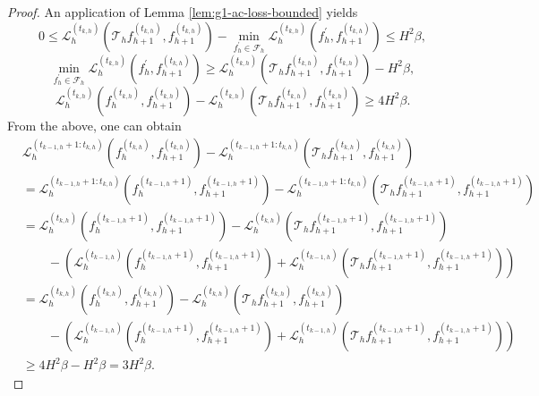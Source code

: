 \begin{proof}
    An application of Lemma \ref{lem:g1-ac-loss-bounded} yields 
    $$0 \leq \mathcal{L}_h^{\left(t_{k,h}\right)}\left(\mathcal{T}_h f_{h+1}^{(t_{k,h})}, f_{h+1}^{(t_{k,h})}\right)-\min _{f_h^{\prime} \in \mathcal{F}_h} \mathcal{L}_h^{\left(t_{k,h}\right)}\left(f_h^{\prime}, f_{h+1}^{(t_{k,h})}\right) \leq H^2 \beta,$$
    $$\min _{f_h^{\prime} \in \mathcal{F}_h} \mathcal{L}_h^{\left(t_{k,h}\right)}\left(f_h^{\prime}, f_{h+1}^{(t_{k,h})}\right)  \geq \mathcal{L}_h^{\left(t_{k,h}\right)}\left(\mathcal{T}_h f_{h+1}^{(t_{k,h})}, f_{h+1}^{(t_{k,h})}\right)- H^2 \beta,$$
    $$\mathcal{L}_h^{(t_{k,h})}\left(f_h^{(t_{k,h})}, f_{h+1}^{(t_{k,h})}\right)-\mathcal{L}_h^{\left(t_{k,h}\right)}\left(\mathcal{T}_h f_{h+1}^{(t_{k,h})}, f_{h+1}^{(t_{k,h})}\right) \geq 4H^2\beta.
    $$
    From the above, one can obtain 
    \begin{align}
        &\mathcal{L}_h^{(t_{k-1,h}+1:t_{k,h})}\left(f_h^{(t_{k,h})}, f_{h+1}^{(t_{k,h})}\right)-\mathcal{L}_h^{\left(t_{k-1,h}+1:t_{k,h}\right)}\left(\mathcal{T}_h f_{h+1}^{(t_{k,h})}, f_{h+1}^{(t_{k,h})}\right) \nonumber\\
        &=\mathcal{L}_h^{(t_{k-1,h}+1:t_{k,h})}\left(f_h^{(t_{k-1,h}+1)}, f_{h+1}^{(t_{k-1,h}+1)}\right)-\mathcal{L}_h^{\left(t_{k-1,h}+1:t_{k,h}\right)}\left(\mathcal{T}_h f_{h+1}^{(t_{k-1,h}+1)}, f_{h+1}^{(t_{k-1,h}+1)}\right) \nonumber\\
        &= \mathcal{L}_h^{(t_{k,h})}\left(f_h^{(t_{k-1,h}+1)}, f_{h+1}^{(t_{k-1,h}+1)}\right)-\mathcal{L}_h^{\left(t_{k,h}\right)}\left(\mathcal{T}_h f_{h+1}^{(t_{k-1,h}+1)}, f_{h+1}^{(t_{k-1,h}+1)}\right) \nonumber\\
        &\qquad- \left(\mathcal{L}_h^{(t_{k-1,h})}\left(f_h^{(t_{k-1,h}+1)}, f_{h+1}^{(t_{k-1,h}+1)}\right) +\mathcal{L}_h^{\left(t_{k-1,h}\right)}\left(\mathcal{T}_h f_{h+1}^{(t_{k-1,h}+1)}, f_{h+1}^{(t_{k-1,h}+1)}\right)\right) \nonumber\\
        &= \mathcal{L}_h^{(t_{k,h})}\left(f_h^{(t_{k,h})}, f_{h+1}^{(t_{k,h})}\right)-\mathcal{L}_h^{\left(t_{k,h}\right)}\left(\mathcal{T}_h f_{h+1}^{(t_{k,h})}, f_{h+1}^{(t_{k,h})}\right) \nonumber\\
        &\qquad- \left(\mathcal{L}_h^{(t_{k-1,h})}\left(f_h^{(t_{k-1,h}+1)}, f_{h+1}^{(t_{k-1,h}+1)}\right) + \mathcal{L}_h^{\left(t_{k-1,h}\right)}\left(\mathcal{T}_h f_{h+1}^{(t_{k-1,h}+1)}, f_{h+1}^{(t_{k-1,h}+1)}\right)\right) \nonumber\\
        &\geq 4H^2\beta - H^2\beta = 3H^2\beta.
    \end{align}
    

\end{proof}
